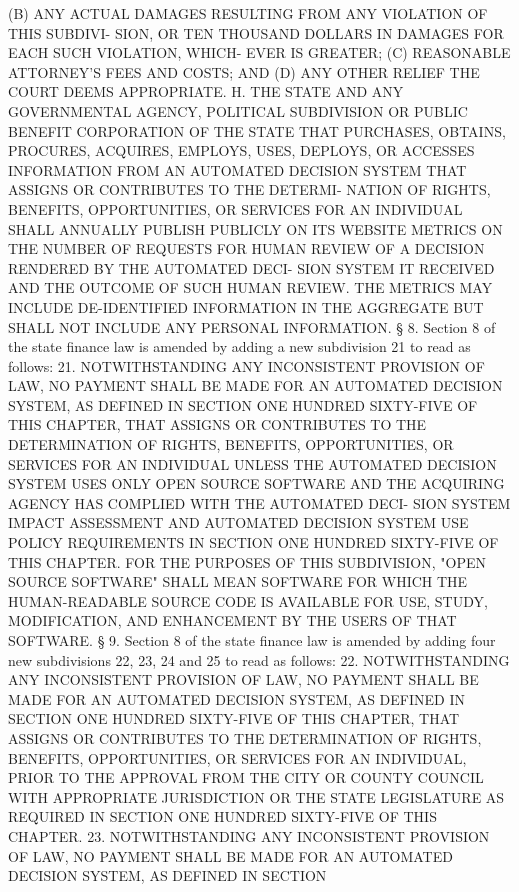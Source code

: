    (B) ANY ACTUAL DAMAGES RESULTING FROM ANY VIOLATION OF  THIS  SUBDIVI-
 SION, OR TEN THOUSAND DOLLARS IN DAMAGES FOR EACH SUCH VIOLATION, WHICH-
 EVER IS GREATER;
   (C) REASONABLE ATTORNEY'S FEES AND COSTS; AND
   (D) ANY OTHER RELIEF THE COURT DEEMS APPROPRIATE.
   H.  THE  STATE  AND  ANY GOVERNMENTAL AGENCY, POLITICAL SUBDIVISION OR
 PUBLIC  BENEFIT  CORPORATION  OF  THE  STATE  THAT  PURCHASES,  OBTAINS,
 PROCURES, ACQUIRES, EMPLOYS, USES, DEPLOYS, OR ACCESSES INFORMATION FROM
 AN AUTOMATED DECISION SYSTEM THAT ASSIGNS OR CONTRIBUTES TO THE DETERMI-
 NATION OF RIGHTS, BENEFITS, OPPORTUNITIES, OR SERVICES FOR AN INDIVIDUAL
 SHALL  ANNUALLY PUBLISH PUBLICLY ON ITS WEBSITE METRICS ON THE NUMBER OF
 REQUESTS FOR HUMAN REVIEW OF A DECISION RENDERED BY THE AUTOMATED  DECI-
 SION  SYSTEM  IT  RECEIVED  AND  THE  OUTCOME  OF SUCH HUMAN REVIEW. THE
 METRICS MAY INCLUDE DE-IDENTIFIED INFORMATION IN THE AGGREGATE BUT SHALL
 NOT INCLUDE ANY PERSONAL INFORMATION.
   § 8. Section 8 of the state finance law is amended  by  adding  a  new
 subdivision 21 to read as follows:
   21.  NOTWITHSTANDING  ANY  INCONSISTENT  PROVISION  OF LAW, NO PAYMENT
 SHALL BE MADE FOR AN AUTOMATED DECISION SYSTEM, AS  DEFINED  IN  SECTION
 ONE  HUNDRED  SIXTY-FIVE OF THIS CHAPTER, THAT ASSIGNS OR CONTRIBUTES TO
 THE DETERMINATION OF RIGHTS, BENEFITS, OPPORTUNITIES, OR SERVICES FOR AN
 INDIVIDUAL UNLESS THE AUTOMATED DECISION SYSTEM USES  ONLY  OPEN  SOURCE
 SOFTWARE  AND THE ACQUIRING AGENCY HAS COMPLIED WITH THE AUTOMATED DECI-
 SION SYSTEM IMPACT ASSESSMENT AND AUTOMATED DECISION SYSTEM  USE  POLICY
 REQUIREMENTS  IN SECTION ONE HUNDRED SIXTY-FIVE OF THIS CHAPTER. FOR THE
 PURPOSES OF THIS SUBDIVISION, "OPEN SOURCE SOFTWARE" SHALL MEAN SOFTWARE
 FOR WHICH THE HUMAN-READABLE SOURCE CODE IS AVAILABLE  FOR  USE,  STUDY,
 MODIFICATION, AND ENHANCEMENT BY THE USERS OF THAT SOFTWARE.
   §  9. Section 8 of the state finance law is amended by adding four new
 subdivisions 22, 23, 24 and 25 to read as follows:
   22. NOTWITHSTANDING ANY INCONSISTENT  PROVISION  OF  LAW,  NO  PAYMENT
 SHALL  BE  MADE  FOR AN AUTOMATED DECISION SYSTEM, AS DEFINED IN SECTION
 ONE HUNDRED SIXTY-FIVE OF THIS CHAPTER, THAT ASSIGNS OR  CONTRIBUTES  TO
 THE DETERMINATION OF RIGHTS, BENEFITS, OPPORTUNITIES, OR SERVICES FOR AN
 INDIVIDUAL,  PRIOR  TO THE APPROVAL FROM THE CITY OR COUNTY COUNCIL WITH
 APPROPRIATE JURISDICTION OR THE STATE LEGISLATURE AS REQUIRED IN SECTION
 ONE HUNDRED SIXTY-FIVE OF THIS CHAPTER.
   23. NOTWITHSTANDING ANY INCONSISTENT  PROVISION  OF  LAW,  NO  PAYMENT
 SHALL  BE  MADE  FOR AN AUTOMATED DECISION SYSTEM, AS DEFINED IN SECTION
